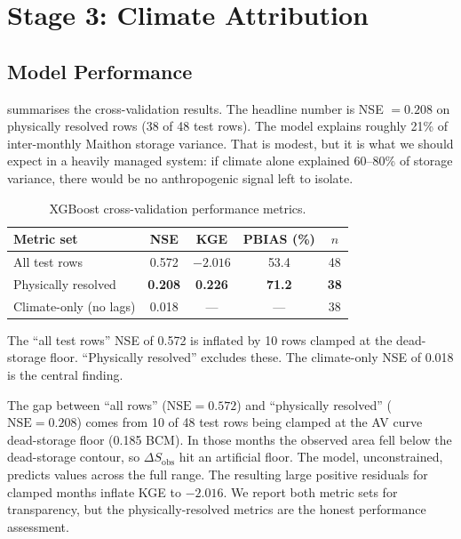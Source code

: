 \documentclass[12pt,a4paper,oneside]{report}
\newcommand{\dSobs}{\Delta S_{\mathrm{obs}}}
\newcommand{\NSE}{\mathrm{NSE}}
\begin{document}
\section{Stage 3: Climate Attribution}

\subsection{Model Performance}

 summarises the cross-validation results. The headline
number is NSE $= 0.208$ on physically resolved rows (38 of 48 test rows).
The model explains roughly 21\% of inter-monthly Maithon storage variance.
That is modest, but it is what we should expect in a heavily managed system:
if climate alone explained 60--80\% of storage variance, there would be no
anthropogenic signal left to isolate.

\begin{table}[htbp]
  \centering
  \caption{XGBoost cross-validation performance metrics.}
  \label{tab:thesis_cv}
  \begin{tabular}{lcccc}
    \toprule
    Metric set & NSE & KGE & PBIAS (\%) & $n$ \\
    \midrule
    All test rows & 0.572 & $-2.016$ & 53.4 & 48 \\
    Physically resolved & \textbf{0.208} & \textbf{0.226} & \textbf{71.2} & \textbf{38} \\
    Climate-only (no lags) & 0.018 & --- & --- & 38 \\
    \bottomrule
  \end{tabular}

  \smallskip

  {\footnotesize The ``all test rows'' NSE of 0.572 is inflated by 10 rows
  clamped at the dead-storage floor. ``Physically resolved'' excludes these.
  The climate-only NSE of 0.018 is the central finding.}
\end{table}

The gap between ``all rows'' ($\NSE = 0.572$) and ``physically resolved''
($\NSE = 0.208$) comes from 10 of 48 test rows being clamped at the AV
curve dead-storage floor (0.185 BCM). In those months the observed area fell
below the dead-storage contour, so $\dSobs$ hit an artificial floor. The
model, unconstrained, predicts values across the full range. The resulting
large positive residuals for clamped months inflate KGE to $-2.016$. We
report both metric sets for transparency, but the physically-resolved
metrics are the honest performance assessment.
\end{document}
